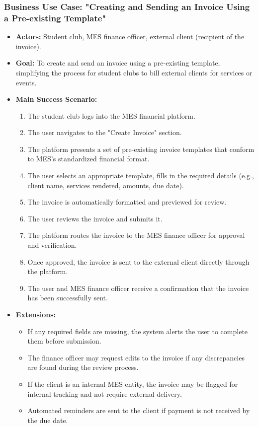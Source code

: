 \documentclass[12pt]{article}
\begin{document}
\subsubsection{\textbf{Business Use Case:} "Creating and Sending an Invoice Using a Pre-existing Template"}

\begin{itemize}
    \item \textbf{Actors:} Student club, MES finance officer, external client (recipient of the invoice).
    
    \item \textbf{Goal:} To create and send an invoice using a pre-existing template, simplifying the process for student clubs to bill external clients for services or events.
    
    \item \textbf{Main Success Scenario:} 
    \begin{enumerate}
        \item The student club logs into the MES financial platform.
        \item The user navigates to the "Create Invoice" section.
        \item The platform presents a set of pre-existing invoice templates that conform to MES’s standardized financial format.
        \item The user selects an appropriate template, fills in the required details (e.g., client name, services rendered, amounts, due date).
        \item The invoice is automatically formatted and previewed for review.
        \item The user reviews the invoice and submits it.
        \item The platform routes the invoice to the MES finance officer for approval and verification.
        \item Once approved, the invoice is sent to the external client directly through the platform.
        \item The user and MES finance officer receive a confirmation that the invoice has been successfully sent.
    \end{enumerate}
    
    \item \textbf{Extensions:} 
    \begin{itemize}
        \item If any required fields are missing, the system alerts the user to complete them before submission.
        \item The finance officer may request edits to the invoice if any discrepancies are found during the review process.
        \item If the client is an internal MES entity, the invoice may be flagged for internal tracking and not require external delivery.
        \item Automated reminders are sent to the client if payment is not received by the due date.
    \end{itemize}
    

\end{itemize}
\end{document}
